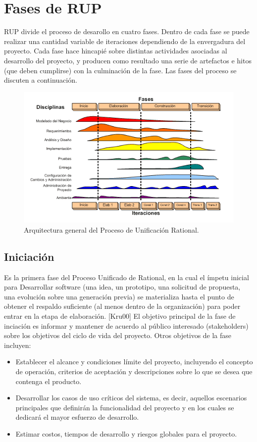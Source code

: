 \section{Fases de RUP}
RUP divide el proceso de desarollo en cuatro fases. Dentro de cada fase se puede realizar una cantidad variable de iteraciones dependiendo de la envergadura del proyecto. Cada fase hace hincapié sobre distintas actividades asociadas al desarrollo del proyecto, y producen como resultado una serie de artefactos e hitos (que deben cumplirse) con la culminación de la fase. Las fases del proceso se discuten a continuación.
\begin{figure}[hbt]
\begin{center}
\includegraphics{RUP}
\caption{Arquitectura general del Proceso de Unificación Rational.}
\label{fig:figura1}  
\end{center}
\end{figure}

\subsection{Iniciación}
Es la primera fase del Proceso Unificado de Rational, en la cual el ímpetu inicial para Desarrollar software (una idea, un prototipo, una solicitud de propuesta, una evolución sobre una generación previa) se materializa hasta el punto de obtener el respaldo suficiente (al menos dentro de la organización) para poder entrar en la etapa de elaboración. [Kru00]
El objetivo principal de la fase de inciación es informar y mantener de acuerdo al público interesado (stakeholders) sobre los objetivos del ciclo de vida del proyecto. Otros objetivos de la fase incluyen:

\begin{itemize}
\item Establecer el alcance y condiciones límite del proyecto, incluyendo el concepto de operación, criterios de aceptación y descripciones sobre lo que se desea que contenga el producto.
\item Desarrollar los casos de uso críticos del sistema, es decir, aquellos escenarios principales que definirán la funcionalidad del proyecto y en los cuales se dedicará el mayor esfuerzo de desarrollo.
\item Estimar costos, tiempos de desarrollo y riesgos globales para el proyecto.
\end{itemize}

